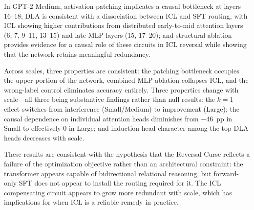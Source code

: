 \documentclass[11pt]{article}
\begin{document}
In GPT-2 Medium, activation patching implicates a causal bottleneck at layers
16--18; DLA is consistent with a dissociation between ICL and SFT routing,
with ICL showing higher contributions from distributed early-to-mid attention
layers (6, 7, 9--11, 13--15) and late MLP layers (15, 17--20); and structural
ablation provides evidence for a causal role of these circuits in ICL reversal
while showing that the network retains meaningful redundancy.

Across scales, three properties are consistent: the patching bottleneck occupies
the upper portion of the network, combined MLP ablation collapses ICL, and the
wrong-label control eliminates accuracy entirely. Three properties change with
scale---all three being substantive findings rather than null results: the $k=1$
effect switches from interference (Small/Medium) to improvement (Large); the
causal dependence on individual attention heads diminishes from $-46$~pp in
Small to effectively $0$ in Large; and induction-head character among the top
DLA heads decreases with scale.

These results are consistent with the hypothesis that the Reversal Curse reflects
a failure of the optimization objective rather than an architectural constraint:
the transformer appears capable of bidirectional relational reasoning, but
forward-only SFT does not appear to install the routing required for it. The
ICL compensating circuit appears to grow more redundant with scale, which has
implications for when ICL is a reliable remedy in practice.

\end{document}

